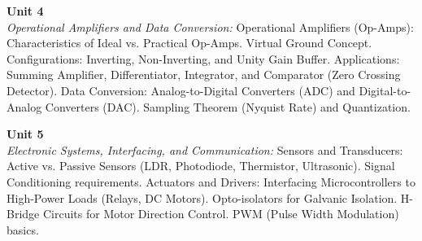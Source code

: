 \vspace{0.3cm}

\noindent\textbf{Unit 4} \\
\textit{Operational Amplifiers and Data Conversion:} Operational Amplifiers (Op-Amps): Characteristics of Ideal vs. Practical Op-Amps. Virtual Ground Concept. Configurations: Inverting, Non-Inverting, and Unity Gain Buffer. Applications: Summing Amplifier, Differentiator, Integrator, and Comparator (Zero Crossing Detector). Data Conversion: Analog-to-Digital Converters (ADC) and Digital-to-Analog Converters (DAC). Sampling Theorem (Nyquist Rate) and Quantization.

\vspace{0.3cm}

\noindent\textbf{Unit 5} \\
\textit{Electronic Systems, Interfacing, and Communication:} Sensors and Transducers: Active vs. Passive Sensors (LDR, Photodiode, Thermistor, Ultrasonic). Signal Conditioning requirements. Actuators and Drivers: Interfacing Microcontrollers to High-Power Loads (Relays, DC Motors). Opto-isolators for Galvanic Isolation. H-Bridge Circuits for Motor Direction Control. PWM (Pulse Width Modulation) basics.

\newpage
{}